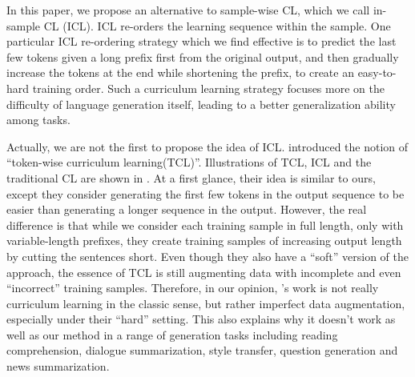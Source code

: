 
In this paper, we propose an alternative to sample-wise CL, which we call 
in-sample CL (ICL). 
ICL re-orders the learning sequence within the sample. 
One particular ICL re-ordering strategy which we find effective is to predict the 
last few tokens given a long prefix first from the original output, and then gradually increase the tokens
at the end while shortening the prefix, to create an easy-to-hard training
order. Such a curriculum learning strategy focuses more on the difficulty of language generation itself,
leading to a better generalization ability among tasks.

Actually, we are not the first to propose the idea of ICL.
\citet{liang-etal-2021-token-wise} introduced the notion of ``token-wise curriculum
learning(TCL)''. %
Illustrations of TCL, ICL and the traditional CL are shown in .
At a first glance,
their idea is similar to ours, except they consider generating the first few tokens
in the output sequence to be easier than generating a longer sequence in the output. 
However, the real difference is that while we consider each training sample in full
length, only with variable-length prefixes, they create training samples of increasing
output length by cutting the sentences short. %
Even though they also have a ``soft'' version of the approach, the essence of TCL
is still augmenting data
with incomplete and even
``incorrect'' training samples. %
Therefore, in our opinion, \citet{liang-etal-2021-token-wise}'s work is not really curriculum learning in the classic sense, but rather imperfect data augmentation, especially under their ``hard'' setting.
This also explains why it doesn't work as well as our method in a range of generation tasks 
including reading comprehension,
dialogue summarization, style transfer, question generation and 
news summarization. 


